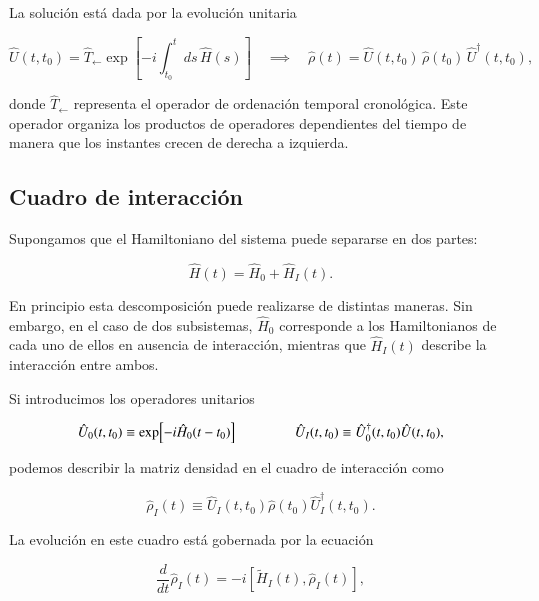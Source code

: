 La solución está dada por la evolución unitaria

\begin{equation*}
    \hat{U}(t,t_{0}) = \hat{T}_{\leftarrow} \exp \left[ -i \int_{t_{0}}^{t} ds\, \hat{H}(s) \right] 
    \quad \implies \quad 
    \hat{\rho}(t) = \hat{U}(t,t_{0})\,\hat{\rho}(t_{0})\,\hat{U}^{\dagger}(t,t_{0}),
\end{equation*}

donde $\hat{T}_{\leftarrow}$ representa el operador de ordenación temporal cronológica. Este operador organiza los productos de operadores dependientes del tiempo de manera que los instantes crecen de derecha a izquierda.

\subsection{Cuadro de interacción}
Supongamos que el Hamiltoniano del sistema puede separarse en dos partes:

\begin{equation*}
    \hat{H}(t) = \hat{H}_{0} + \hat{H}_{I}(t).
\end{equation*}

En principio esta descomposición puede realizarse de distintas maneras. Sin embargo, en el caso de dos subsistemas, $\hat{H}_{0}$ corresponde a los Hamiltonianos de cada uno de ellos en ausencia de interacción, mientras que $\hat{H}_{I}(t)$ describe la interacción entre ambos.  

Si introducimos los operadores unitarios

\begin{equation*}
    \hat{U}_{0}(t,t_{0}) \equiv \exp[-i\hat{H}_{0}(t-t_{0})] 
    \hspace{15mm} 
    \hat{U}_{I}(t,t_0) \equiv \hat{U}^{\dagger}_{0}(t,t_{0})\hat{U}(t,t_{0}),
\end{equation*}

podemos describir la matriz densidad en el cuadro de interacción como

\begin{equation*}
    \hat{\rho}_{I}(t) \equiv \hat{U}_{I}(t,t_{0})\hat{\rho}(t_{0})\hat{U}^{\dagger}_{I}(t,t_{0}).
\end{equation*}

La evolución en este cuadro está gobernada por la ecuación

\begin{equation}
    \frac{d}{dt}\hat{\rho}_{I}(t) = -i[\tilde{H}_{I}(t), \hat{\rho}_{I}(t)],
    \label{sec11:interactionp}
\end{equation}

